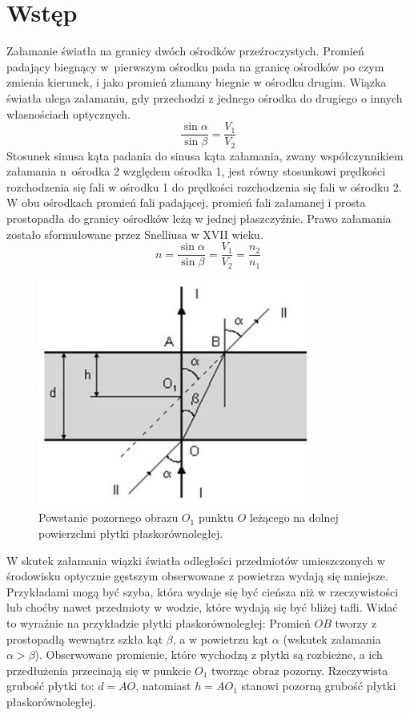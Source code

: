 \documentclass[a4paper,11pt]{article}
\begin{document}
\section{Wstęp}
Załamanie światła na granicy dwóch ośrodków przeźroczystych. Promień padający biegnący w~pierwszym ośrodku pada na granicę ośrodków po czym zmienia kierunek, i jako promień złamany biegnie w ośrodku drugim.	
Wiązka światła ulega załamaniu, gdy przechodzi z jednego ośrodka do drugiego o innych własnościach optycznych.
$$
\frac{\sin{\alpha}}{\sin{\beta}} = \frac{V_1}{V_2}
$$
Stosunek sinusa kąta padania do sinusa kąta załamania, zwany współczynnikiem załamania n~ośrodka 2 względem ośrodka 1, jest równy stosunkowi prędkości rozchodzenia się fali w ośrodku 1 do prędkości rozchodzenia się fali w ośrodku 2. W obu ośrodkach promień fali padającej, promień fali załamanej i prosta prostopadła do granicy ośrodków leżą w jednej płaszczyźnie. Prawo załamania zostało sformułowane przez Snelliusa w XVII wieku. \\
$$
n = \frac{\sin{\alpha}}{\sin{\beta}} = \frac{V_1}{V_2} = \frac{n_2}{n_1}
$$
\begin{figure}[ht]
	\centering
	\includegraphics[width=90mm]{image006.jpg}
	\caption{Powstanie  pozornego  obrazu  $O_{1}$ punktu  $O$  leżącego  na  dolnej  powierzchni płytki płaskorównoległej. }
\end{figure}
W skutek załamania wiązki światła odległości przedmiotów umieszczonych w środowisku optycznie gęstszym obserwowane z powietrza wydają się mniejsze. Przykładami mogą być szyba, która wydaje się być cieńsza niż w rzeczywistości lub choćby nawet przedmioty w wodzie, które wydają się być bliżej tafli. Widać to wyraźnie na przykładzie płytki płaskorównoległej:
Promień $OB$ tworzy z prostopadłą wewnątrz szkła kąt $\beta$, a w powietrzu kąt $\alpha$ (wskutek załamania $\alpha > \beta$). Obserwowane promienie, które wychodzą z płytki są rozbieżne, a ich przedłużenia przecinają się w punkcie $O_1$ tworząc obraz pozorny. Rzeczywista grubość płytki to: $d = AO$, natomiast $h = AO_1$ stanowi pozorną grubość płytki płaskorównoległej.
\end{document}
